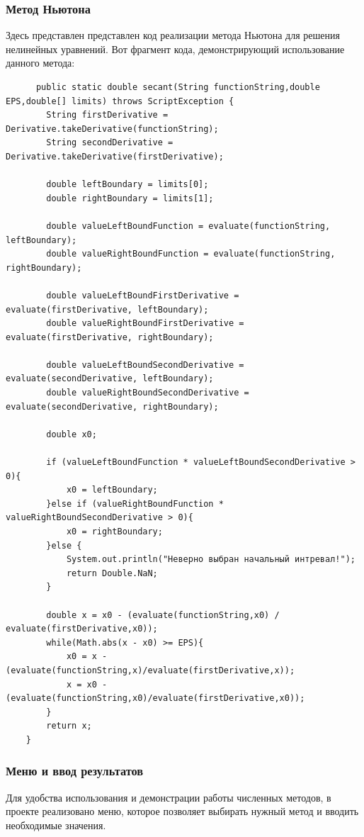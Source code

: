 \documentclass[12pt]{article}
\begin{document}
\subsubsection{Метод Ньютона}
Здесь представлен представлен код реализации метода Ньютона для решения нелинейных уравнений. Вот фрагмент кода, демонстрирующий использование данного метода:

\begin{verbatim}
      public static double secant(String functionString,double EPS,double[] limits) throws ScriptException {
        String firstDerivative = Derivative.takeDerivative(functionString);
        String secondDerivative = Derivative.takeDerivative(firstDerivative);

        double leftBoundary = limits[0];
        double rightBoundary = limits[1];

        double valueLeftBoundFunction = evaluate(functionString, leftBoundary);
        double valueRightBoundFunction = evaluate(functionString, rightBoundary);

        double valueLeftBoundFirstDerivative = evaluate(firstDerivative, leftBoundary);
        double valueRightBoundFirstDerivative = evaluate(firstDerivative, rightBoundary);

        double valueLeftBoundSecondDerivative = evaluate(secondDerivative, leftBoundary);
        double valueRightBoundSecondDerivative = evaluate(secondDerivative, rightBoundary);

        double x0;

        if (valueLeftBoundFunction * valueLeftBoundSecondDerivative > 0){
            x0 = leftBoundary;
        }else if (valueRightBoundFunction * valueRightBoundSecondDerivative > 0){
            x0 = rightBoundary;
        }else {
            System.out.println("Неверно выбран начальный интревал!");
            return Double.NaN;
        }

        double x = x0 - (evaluate(functionString,x0) / evaluate(firstDerivative,x0));
        while(Math.abs(x - x0) >= EPS){
            x0 = x - (evaluate(functionString,x)/evaluate(firstDerivative,x));
            x = x0 - (evaluate(functionString,x0)/evaluate(firstDerivative,x0));
        }
        return x;
    }
\end{verbatim}

\subsubsection{Меню и ввод результатов}
Для удобства использования и демонстрации работы численных методов, в проекте реализовано меню, которое позволяет выбирать нужный метод и вводить необходимые значения.
\end{document}
